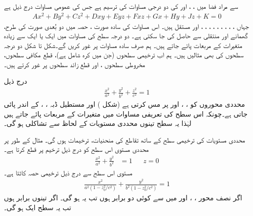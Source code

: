 سے مراد فضا میں    ،  ، اور  کی دو درجی مساوات کی  ترسیم ہے جس  کی عمومی مساوات درج ذیل ہے
\begin{align*}
Ax^2+By^2+Cz^2+Dxy+Eyz+Fxz+Gx+Hy+Jz+K=0
\end{align*}
جہاں ، ، ، ، ، ، ، ،   ، اور  مستقل ہیں۔ اس مساوات کی سادہ صورت  ، حصہ   میں دو بُعدی صورت کی طرح، گھمانے اور منتقلی سے حاصل کی جا سکتی ہے۔ دو درجہ سطح کی مساوات میں ایک یا ایک سے زیادہ متغیرات کے مربعات پائے جاتے ہیں۔  ہم صرف سادہ مساوات پر غور کریں گے۔شکل  تا شکل   دو درجہ سطحوں کی بھی مثالیں   ہیں۔ ہم اب  ترخیمی سطحوں (جن میں کرہ شامل ہے)،  قطع مکافی  سطحوں،  مخروطی  سطحوں ، اور قطع زائد سطحوں  پر غور کرتے ہیں۔

درج ذیل 
\begin{align}
\frac{x^2}{a^2}+\frac{y^2}{b^2}+\frac{z^2}{c^2}=1
\end{align}
  محددی محوروں کو ، ،  اور  پر مس کرتی ہے (شکل ) اور  مستطیل ڈبہ  ،
  ،   کے اندر پائی جاتی ہے۔چونکہ اس سطح کی تعریفی مساوات میں متغیرات کے مربعات پائے  جاتے  ہیں  لہٰذا   یہ سطح تینوں محددی مستویات  کے لحاظ سے تشاکلی  ہو گی۔

محددی مستویات  کی ترخیمی  سطح کے ساتھ  تقاطع کی منحنیات،   ترخیمات ہوں گی۔ مثال کے طور پر محددی مستوی   اس سطح کو درج ذیل ترخیم پر قطع کرتا ہے۔
\begin{align*}
\frac{x^2}{a^2}+\frac{y^2}{b^2}&=1&&z=0
\end{align*}
مستوی    اس سطح سے درج ذیل  ترخیمی حصہ کاٹتا ہے۔
\begin{align*}
\frac{x^2}{a^2(1-z_0^2/c^2)}+\frac{y^2}{b^2(1-z_0^2/c^2)}=1
\end{align*}
اگر نصف محور ، ،  اور  میں سے   کوئی دو برابر ہوں تب یہ  ہو گی۔  اگر تینوں   برابر ہوں تب یہ  سطح ایک  ہو گی۔

